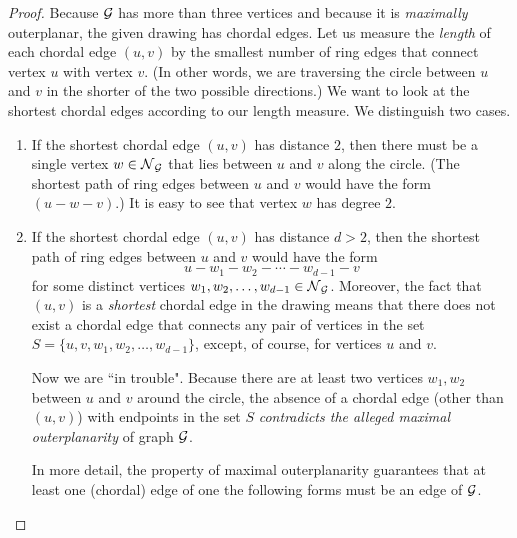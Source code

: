 \begin{proof}
\smallskip

Because $\mbox{$\cal G$}$ has more than three vertices and because it is {\em maximally} outerplanar, the given drawing has chordal edges.  Let us measure the {\em length} of each chordal edge $(u,v)$ by the smallest number of ring edges that connect vertex $u$ with vertex $v$.  (In other words, we are traversing the circle between $u$ and $v$ in the shorter of the two possible directions.)  We want to look at the shortest chordal edges according to our length measure.  We distinguish two cases.
\begin{enumerate}
\item
If the shortest chordal edge $(u,v)$ has distance $2$, then there must be a single vertex $w \in \mbox{$\cal N$}_{\mbox{{\scriptsize $\cal G$}}}$ that lies between $u$ and $v$ along the circle.  (The shortest path of ring edges between $u$ and $v$ would have the form $(u - w - v)$.)  It is easy to see that vertex $w$ has degree $2$.

\medskip\item
If the shortest chordal edge $(u,v)$ has distance $d > 2$, then the shortest path of ring edges between $u$ and $v$ would have the form
\[ u - w_1 - w_2 - \cdots - w_{d-1} - v \]
for some distinct vertices $w_1, w_2, \ldots, w_{d-1} \in \mbox{$\cal N$}_{\mbox{{\scriptsize $\cal G$}}}$.  Moreover, the fact that $(u,v)$
is a {\em shortest} chordal edge in the drawing means that there does not exist a chordal edge that connects any pair of vertices in the set $S= \{u, v, w_1, w_2, \ldots, w_{d-1}\}$, except, of course, for vertices $u$ and $v$.

\smallskip

Now we are ``in trouble".  Because there are at least two vertices $w_1, w_2$ between $u$ and $v$ around the circle, the absence of a chordal edge (other than $(u,v)$) with endpoints in the set $S$ {\em contradicts the alleged maximal outerplanarity} of graph $\mbox{$\cal G$}$.

\smallskip

In more detail, the property of maximal outerplanarity guarantees that at least one (chordal) edge of one the following forms must be an edge of $\mbox{$\cal G$}$.

\smallskip


\end{enumerate}
\end{proof}
